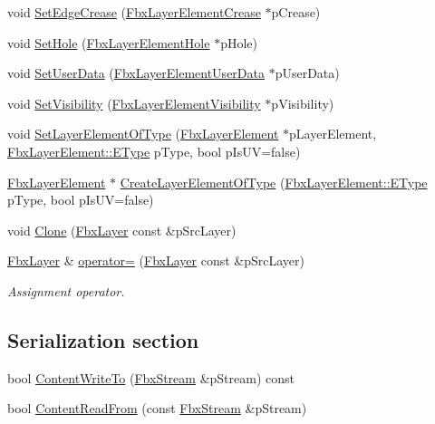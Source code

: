 \begin{DoxyCompactItemize}
\item 
void \hyperlink{class_fbx_layer_a75d465b2a9349563471e7d1f8a983b2b}{Set\+Edge\+Crease} (\hyperlink{class_fbx_layer_element_crease}{Fbx\+Layer\+Element\+Crease} $\ast$p\+Crease)
\item 
void \hyperlink{class_fbx_layer_a16ce520e59a557fc056a2ca5a58f2de6}{Set\+Hole} (\hyperlink{class_fbx_layer_element_hole}{Fbx\+Layer\+Element\+Hole} $\ast$p\+Hole)
\item 
void \hyperlink{class_fbx_layer_a5a3f5e9ed349cf6bfe70801bf7452005}{Set\+User\+Data} (\hyperlink{class_fbx_layer_element_user_data}{Fbx\+Layer\+Element\+User\+Data} $\ast$p\+User\+Data)
\item 
void \hyperlink{class_fbx_layer_a41ca8570422586a5656c6848c2ae2971}{Set\+Visibility} (\hyperlink{class_fbx_layer_element_visibility}{Fbx\+Layer\+Element\+Visibility} $\ast$p\+Visibility)
\item 
void \hyperlink{class_fbx_layer_a8a26e04b7f1e6f60e3f008a81b0ab6a0}{Set\+Layer\+Element\+Of\+Type} (\hyperlink{class_fbx_layer_element}{Fbx\+Layer\+Element} $\ast$p\+Layer\+Element, \hyperlink{class_fbx_layer_element_a8c95c5cd880b56c776acd379bd86f42c}{Fbx\+Layer\+Element\+::\+E\+Type} p\+Type, bool p\+Is\+UV=false)
\item 
\hyperlink{class_fbx_layer_element}{Fbx\+Layer\+Element} $\ast$ \hyperlink{class_fbx_layer_aaad9ca915179b63c47a51f6b77cbaf43}{Create\+Layer\+Element\+Of\+Type} (\hyperlink{class_fbx_layer_element_a8c95c5cd880b56c776acd379bd86f42c}{Fbx\+Layer\+Element\+::\+E\+Type} p\+Type, bool p\+Is\+UV=false)
\item 
void \hyperlink{class_fbx_layer_a9922eb8a5f4cd1c6c5084f96eab5c4a8}{Clone} (\hyperlink{class_fbx_layer}{Fbx\+Layer} const \&p\+Src\+Layer)
\item 
\hyperlink{class_fbx_layer}{Fbx\+Layer} \& \hyperlink{class_fbx_layer_a3563fcb2cc9c4b00ace7450203371ee6}{operator=} (\hyperlink{class_fbx_layer}{Fbx\+Layer} const \&p\+Src\+Layer)
\begin{DoxyCompactList}\small\item\em Assignment operator. \end{DoxyCompactList}\end{DoxyCompactItemize}
\subsection*{Serialization section}
\begin{DoxyCompactItemize}
\item 
bool \hyperlink{class_fbx_layer_a770af000fd689d4bcb50cf92a93d05eb}{Content\+Write\+To} (\hyperlink{class_fbx_stream}{Fbx\+Stream} \&p\+Stream) const
\item 
bool \hyperlink{class_fbx_layer_a1792e8893a30458e6634f3db09a592d5}{Content\+Read\+From} (const \hyperlink{class_fbx_stream}{Fbx\+Stream} \&p\+Stream)
\end{DoxyCompactItemize}


